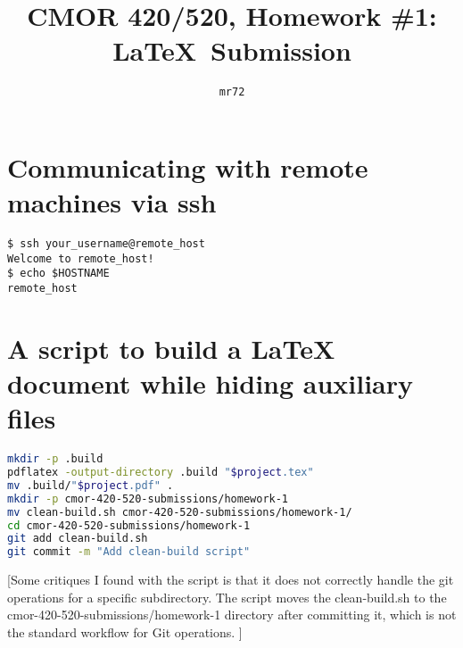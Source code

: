 \documentclass{article}
\title{CMOR 420/520, Homework \#1: LaTeX\ Submission}
\author{\texttt{mr72}}
\begin{document}
\maketitle

\section{Communicating with remote machines via ssh}

\begin{verbatim}
$ ssh your_username@remote_host
Welcome to remote_host!
$ echo $HOSTNAME
remote_host
\end{verbatim}

\section{A script to build a LaTeX document while hiding auxiliary files}

\begin{lstlisting}[language=bash, basicstyle=\ttfamily, caption={Script to compile LaTeX documents and manage auxiliary files.}]
mkdir -p .build
pdflatex -output-directory .build "$project.tex"
mv .build/"$project.pdf" .
mkdir -p cmor-420-520-submissions/homework-1
mv clean-build.sh cmor-420-520-submissions/homework-1/
cd cmor-420-520-submissions/homework-1
git add clean-build.sh
git commit -m "Add clean-build script"
\end{lstlisting}

[Some critiques I found with the script is that it does not correctly handle the git operations for a specific subdirectory. The script moves the clean-build.sh to the cmor-420-520-submissions/homework-1 directory after committing it, which is not the standard workflow for Git operations. ]
\end{document}
